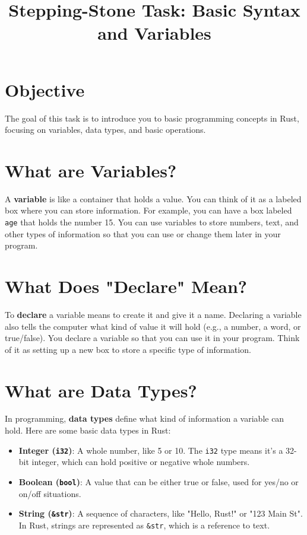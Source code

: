 \documentclass[12pt]{article}
\title{Stepping-Stone Task: Basic Syntax and Variables}
\author{}
\date{}
\begin{document}
	
	\maketitle
	
	\section*{Objective}
	The goal of this task is to introduce you to basic programming concepts in Rust, focusing on variables, data types, and basic operations.
	
	\section*{What are Variables?}
	A \textbf{variable} is like a container that holds a value. You can think of it as a labeled box where you can store information. For example, you can have a box labeled \texttt{age} that holds the number 15. You can use variables to store numbers, text, and other types of information so that you can use or change them later in your program.
	
	\section*{What Does "Declare" Mean?}
	To \textbf{declare} a variable means to create it and give it a name. Declaring a variable also tells the computer what kind of value it will hold (e.g., a number, a word, or true/false). You declare a variable so that you can use it in your program. Think of it as setting up a new box to store a specific type of information.
	
	\section*{What are Data Types?}
	In programming, \textbf{data types} define what kind of information a variable can hold. Here are some basic data types in Rust:
	\begin{itemize}
		\item \textbf{Integer (\texttt{i32})}: A whole number, like 5 or 10. The \texttt{i32} type means it's a 32-bit integer, which can hold positive or negative whole numbers.
		\item \textbf{Boolean (\texttt{bool})}: A value that can be either true or false, used for yes/no or on/off situations.
		\item \textbf{String (\texttt{\&str})}: A sequence of characters, like "Hello, Rust!" or "123 Main St". In Rust, strings are represented as \texttt{\&str}, which is a reference to text.
	\end{itemize}
	
\end{document}
